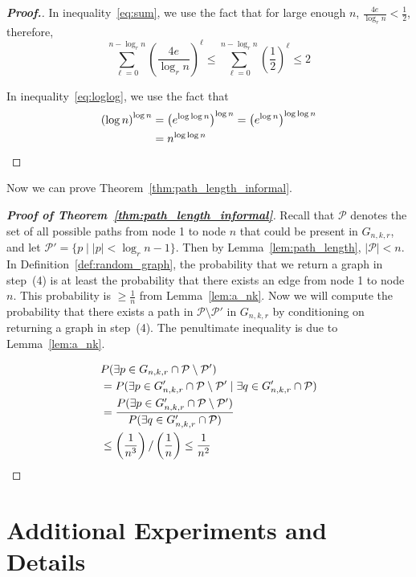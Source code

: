 \documentclass[11pt]{article}
\numberwithin{equation}{section}
\numberwithin{figure}{section}
\theoremstyle{plain}
\theoremstyle{definition}
\begin{document}
\begin{proof}[\textbf{Proof.}]
In inequality~\ref{eq:sum}, we use the fact that for large enough $n$,
$\frac{4e}{\log_r n}<\frac{1}{2}$, therefore, 
\begin{equation*}
\sum_{\ell=0}^{n-\log_r n}\left(\frac{4e}{\log_r n}\right)^\ell
\leq \sum_{\ell=0}^{n-\log_r n}\left(\frac{1}{2}\right)^\ell\leq 2
\end{equation*}

In inequality~\ref{eq:loglog}, we use the fact that
\begin{align*}
\left(\log n\right)^{\log n}&=\left(e^{\log \log n}\right)^{\log n}
=\left(e^{\log n}\right)^{\log \log n}\\
&=n^{\log \log n} \qedhere
\end{align*}
\end{proof}


Now we can prove Theorem~\ref{thm:path_length_informal}.

\begin{proof}[\textbf{Proof of Theorem~\ref{thm:path_length_informal}}]

Recall that $\mathcal{P}$ denotes the set of all 
possible paths from node 1 to node $n$ that could be present
in $G_{n,k,r}$,
and let $\mathcal{P}'=\{p\mid |p|<\log_r n - 1\}$.
Then by Lemma~\ref{lem:path_length}, $|\mathcal{P}|<n$.
In Definition~\ref{def:random_graph}, the probability that we return a
graph in step~(4) is at least the probability that there exists an edge
from node 1 to node $n$. This probability is $\geq\frac{1}{n}$ from
Lemma~\ref{lem:a_nk}.
Now we will compute the probability that there exists a path in
$\mathcal{P}\setminus \mathcal{P}'$ in $G_{n,k,r}$
by conditioning on returning a graph in step~(4).
The penultimate inequality is due to Lemma~\ref{lem:a_nk}.

\begin{align*}
&P(\exists p\in G_{n,k,r}\cap \mathcal{P}\setminus\mathcal{P}')\\
&= P(\exists p\in G'_{n,k,r}\cap\mathcal{P}\setminus\mathcal{P}'
\mid \exists q\in G'_{n,k,r}\cap\mathcal{P})\\
&= \frac{P(\exists p\in G'_{n,k,r}\cap\mathcal{P}\setminus\mathcal{P}')}
{P(\exists q\in G'_{n,k,r}\cap\mathcal{P})}\\
&\leq \left(\frac{1}{n^{3}}\right) / \left(\frac{1}{n}\right)
\leq \frac{1}{n^{2}} \qedhere
\end{align*}
\end{proof} \section{Additional Experiments and Details}
\label{app:experiments}
\end{document}
